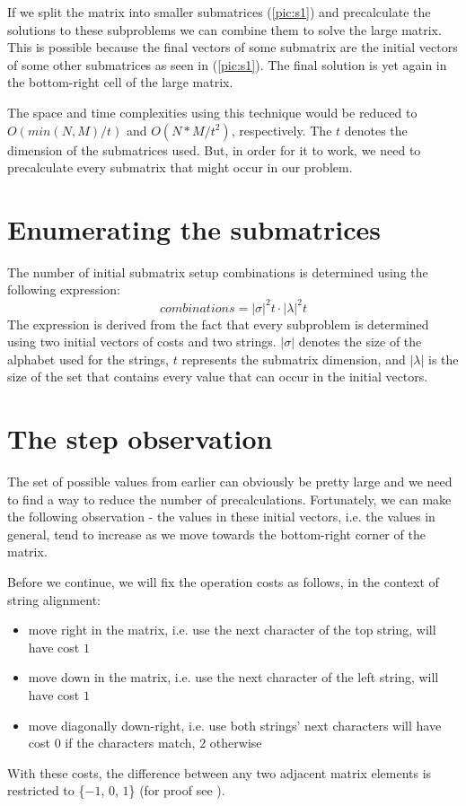 \documentclass[times, utf8, seminar, numeric]{fer}
\begin{document}
If we split the matrix into smaller submatrices (\ref{pic:s1}) and precalculate the solutions to these subproblems we can combine them to solve the large matrix. This is possible because the final vectors of some submatrix are the initial vectors of some other submatrices as seen in (\ref{pic:s1}). The final solution is yet again in the bottom-right cell of the large matrix.

The space and time complexities using this technique would be reduced to \\
$O(min(N, M) / t)$ and $O(N * M / t^2)$, respectively. The $t$ denotes the dimension of the submatrices used. But, in order for it to work, we need to precalculate every submatrix that might occur in our problem.

\section{Enumerating the submatrices}
The number of initial submatrix setup combinations is determined using the following expression:
\begin{equation}
  combinations = |\sigma|^2t \cdot |\lambda|^2t
\end{equation}
The expression is derived from the fact that every subproblem is determined using two initial vectors of costs and two strings. $|\sigma|$ denotes the size of the alphabet used for the strings, $t$ represents the submatrix dimension, and $|\lambda|$ is the size of the set that contains every value that can occur in the initial vectors.

\section{The step observation}
The set of possible values from earlier can obviously be pretty large and we need to find a way to reduce the number of precalculations. Fortunately, we can make the following observation - the values in these initial vectors, i.e. the values in general, tend to increase as we move towards the bottom-right corner of the matrix.

Before we continue, we will fix the operation costs as follows, in the context of string alignment:
\begin{itemize}
\item move right in the matrix, i.e. use the next character of the top string, will have cost $1$
\item move down in the matrix, i.e. use the next character of the left string, will have cost $1$
\item move diagonally down-right, i.e. use both strings' next characters will have cost $0$ if the characters match, $2$ otherwise
\end{itemize}
With these costs, the difference between any two adjacent matrix elements is restricted to \{$-1$, $0$, $1$\} (for proof see \citep{gusfield1997algorithms}).
\end{document}
